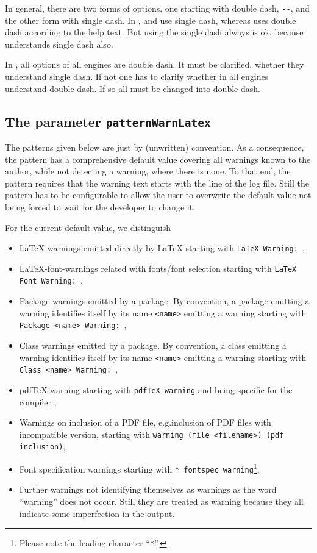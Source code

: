 In general, there are two forms of options, one starting with double dash, \texttt{-{}-}, 
and the other form with single dash. 
In \texlive, \pdflatex{} and \xelatex{} use single dash, 
whereas \lualatex{} uses double dash according to the help text. 
But using the single dash always is ok, 
because \lualatex{} understands single dash also. 

In \miktex, all options of all engines are double dash. 
It must be clarified, whether they understand single dash. 
If not one has to clarify whether in \texlive{} all engines understand double dash. 
If so all must be changed into double dash. 


\subsection{The parameter \texttt{patternWarnLatex}}%
\label{subsec:patternWarnLatex}

The patterns given below are just by (unwritten) convention. 
As a consequence, the pattern has a comprehensive default value 
covering all warnings known to the author, 
while not detecting a warning, where there is none. 
To that end, the pattern requires 
that the warning text starts with the line of the log file. 
Still the pattern has to be configurable 
to allow the user to overwrite the default value 
not being forced to wait for the developer 
to change it. 

For the current default value, we distinguish 
%
\begin{itemize}
\item
\LaTeX-warnings emitted directly by \LaTeX{} 
starting with \texttt{LaTeX Warning: }, 
\item
\LaTeX-font-warnings related with fonts/font selection 
starting with \texttt{LaTeX Font Warning: }, 
\item
Package warnings emitted by a package. 
By convention, a package emitting a warning identifies itself 
by its name \texttt{<name>}
emitting a warning starting with \texttt{Package <name> Warning: }, 
\item
Class warnings emitted by a package. 
By convention, a class emitting a warning identifies itself 
by its name \texttt{<name>}
emitting a warning starting with \texttt{Class <name> Warning: }, 
\item
pdf\TeX-warning starting with \texttt{pdfTeX warning} 
and being specific for the compiler \pdflatex, 
\item 
Warnings on inclusion of a PDF file, 
e.g.\@ inclusion of PDF files with incompatible version, 
starting with \texttt{warning  (file <filename>) (pdf inclusion)}, 
\item
Font specification warnings starting with \texttt{* fontspec warning}\footnote%
{Please note the leading character ``\texttt{*}''. }, 
\item
Further warnings not identifying themselves as warnings 
as the word ``warning'' does not occur. 
Still they are treated as warning 
because they all indicate some imperfection in the output. 
\end{itemize}

